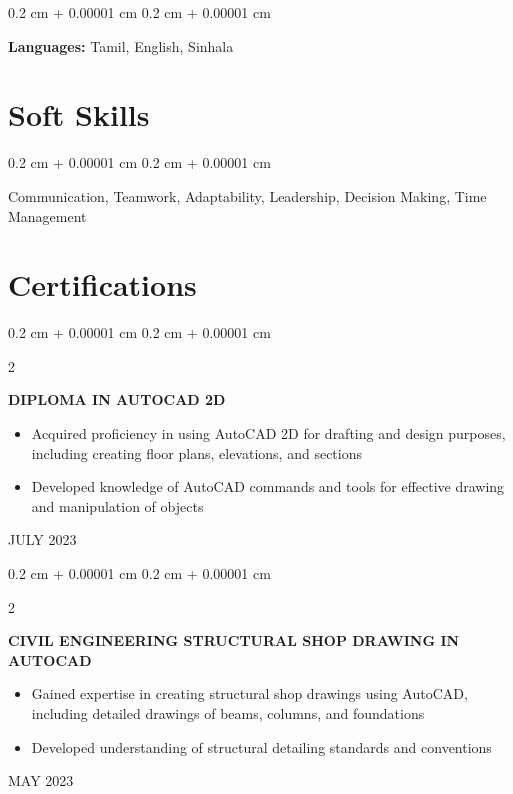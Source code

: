 \documentclass[10pt, letterpaper]{article}
\newenvironment{highlights}{
    \begin{itemize}[
        topsep=0.10 cm,
        parsep=0.10 cm,
        partopsep=0pt,
        itemsep=0pt,
        leftmargin=0.4 cm + 10pt
    ]
}{
    \end{itemize}
} %
\newenvironment{onecolentry}{
    \begin{adjustwidth}{
        0.2 cm + 0.00001 cm
    }{
        0.2 cm + 0.00001 cm
    }
}{
    \end{adjustwidth}
} %
\newenvironment{twocolentry}[2][]{
    \onecolentry
    \def\secondColumn{#2}
    \setcolumnwidth{\fill, 4.5 cm}
    \begin{paracol}{2}
    }{
    \switchcolumn \raggedleft \secondColumn
    \end{paracol}
    \endonecolentry
} %
\begin{document}
        \vspace{0.2 cm}

        \begin{onecolentry}
            \textbf{Languages:} Tamil, English, Sinhala
        \end{onecolentry}


    
    \section{Soft Skills}



        
        \begin{onecolentry}
            Communication, Teamwork, Adaptability, Leadership, Decision Making, Time Management
        \end{onecolentry}


    
    \section{Certifications}



        
        \begin{twocolentry}{
            21 JULY 2023
        }
            \textbf{DIPLOMA IN AUTOCAD 2D}
            \begin{highlights}
                \item  Acquired proficiency in using AutoCAD 2D for drafting and design purposes, including creating floor plans, elevations, and sections
                \item  Developed knowledge of AutoCAD commands and tools for effective drawing and manipulation of objects
            \end{highlights}
        \end{twocolentry}


        \vspace{0.2 cm}

        \begin{twocolentry}{
            03 MAY 2023
        }
            \textbf{CIVIL ENGINEERING STRUCTURAL SHOP DRAWING IN AUTOCAD}
            \begin{highlights}
                \item  Gained expertise in creating structural shop drawings using AutoCAD, including detailed drawings of beams, columns, and foundations
                \item  Developed understanding of structural detailing standards and conventions
            \end{highlights}
        \end{twocolentry}
\end{document}
